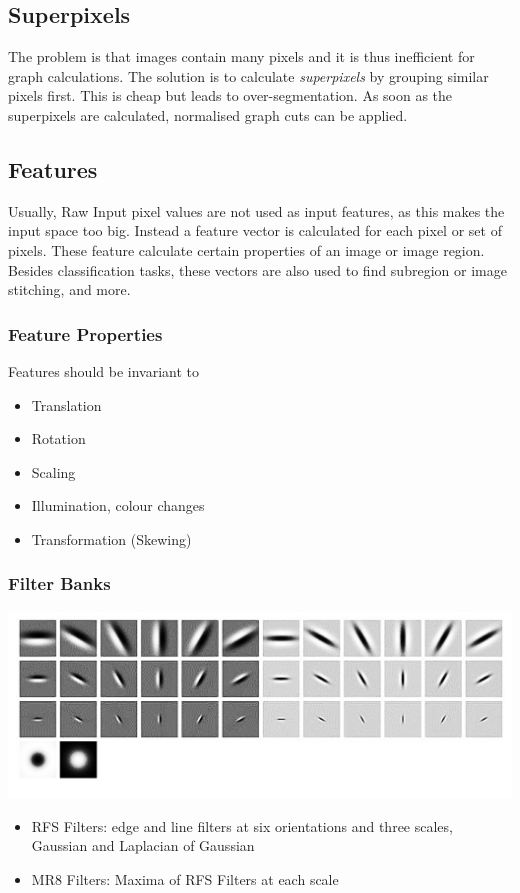 \documentclass[x11names,11pt,a4paper]{article}
\theoremstyle{definition}
\begin{document}
\subsection{Superpixels}
The problem is that images contain many pixels and it is thus inefficient for graph calculations. The solution is to calculate \emph{superpixels} by grouping similar pixels first. This is cheap but leads to over-segmentation. As soon as the superpixels are calculated, normalised graph cuts can be applied.

\subsection{Features}
Usually, Raw Input pixel values are not used as input features, as this makes the input space too big. Instead a feature vector is calculated for each pixel or set of pixels. These feature calculate certain properties of an image or image region. Besides classification tasks, these vectors are also used to find subregion or image stitching, and more.

\subsubsection{Feature Properties}
Features should be invariant to
\begin{itemize}[label=-]
	\item Translation
	\item Rotation
	\item Scaling
	\item Illumination, colour changes
	\item Transformation (Skewing)
\end{itemize}

\subsubsection{Filter Banks}
\begin{center}
	\includegraphics[width=0.6\linewidth]{img/filter_bank}
\end{center}
\begin{itemize}
	\item RFS Filters: edge and line filters at six orientations and three scales, Gaussian and Laplacian of Gaussian
	\item MR8 Filters: Maxima of RFS Filters at each scale
\end{itemize}
\end{document}

